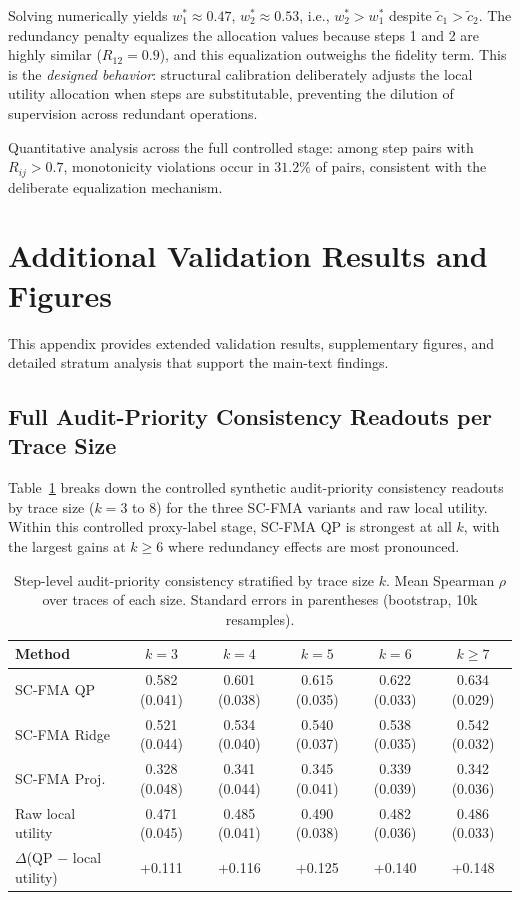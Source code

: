 \documentclass[a4paper,fleqn]{cas-sc}
\begin{document}
Solving numerically yields $w_1^* \approx 0.47$, $w_2^* \approx 0.53$, i.e., $w_2^* > w_1^*$ despite $\tilde{c}_1 > \tilde{c}_2$. The redundancy penalty equalizes the allocation values because steps 1 and 2 are highly similar ($R_{12} = 0.9$), and this equalization outweighs the fidelity term. This is the \emph{designed behavior}: structural calibration deliberately adjusts the local utility allocation when steps are substitutable, preventing the dilution of supervision across redundant operations.

Quantitative analysis across the full controlled stage: among step pairs with $R_{ij} > 0.7$, monotonicity violations occur in $31.2\%$ of pairs, consistent with the deliberate equalization mechanism.

\section{Additional Validation Results and Figures}
\label{app:additional-figures}

This appendix provides extended validation results, supplementary figures, and detailed stratum analysis that support the main-text findings.

\subsection{Full Audit-Priority Consistency Readouts per Trace Size}
\label{app:per-size}

Table~\ref{tab:per-size} breaks down the controlled synthetic audit-priority consistency readouts by trace size ($k = 3$ to $8$) for the three SC-FMA variants and raw local utility. Within this controlled proxy-label stage, SC-FMA QP is strongest at all $k$, with the largest gains at $k \ge 6$ where redundancy effects are most pronounced.

\begin{table}[ht]
\caption{Step-level audit-priority consistency stratified by trace size $k$. Mean Spearman $\rho$ over traces of each size. Standard errors in parentheses (bootstrap, 10k resamples).}
\label{tab:per-size}
\centering
\small
\begin{tabular}{lccccc}
\toprule
\textbf{Method} & $k=3$ & $k=4$ & $k=5$ & $k=6$ & $k \ge 7$ \\
\midrule
SC-FMA QP      & 0.582 (0.041) & 0.601 (0.038) & 0.615 (0.035) & 0.622 (0.033) & 0.634 (0.029) \\
SC-FMA Ridge   & 0.521 (0.044) & 0.534 (0.040) & 0.540 (0.037) & 0.538 (0.035) & 0.542 (0.032) \\
SC-FMA Proj.   & 0.328 (0.048) & 0.341 (0.044) & 0.345 (0.041) & 0.339 (0.039) & 0.342 (0.036) \\
Raw local utility & 0.471 (0.045) & 0.485 (0.041) & 0.490 (0.038) & 0.482 (0.036) & 0.486 (0.033) \\
\midrule
$\Delta$(QP $-$ local utility) & +0.111 & +0.116 & +0.125 & +0.140 & +0.148 \\
\bottomrule
\end{tabular}
\end{table}
\end{document}

